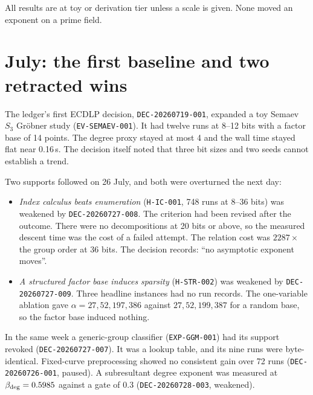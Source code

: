 \begin{table}[t]
\centering\small

\caption[]{ECDLP coordinator decisions by verdict class and month. Classes
follow the index's own plotting rule (\texttt{plot\_index.py}):
\texttt{approve*} and \texttt{revise*} are verdicts with that prefix,
\texttt{amend} and \texttt{refine} count as revisions, each outcome verdict
is matched exactly, and \emph{other} holds every remaining verdict string
(203, mostly free-text decisions of August). Oct-dated: decisions filed
under late-September names with October dates, left out of the
July--September counts. Counted by  from the
committed summary; the per-decision \texttt{INDEX.json} and \texttt{INDEX.tsv}
are held in the artefact store ().
Source: . Data:
.}
\label{tab:fr-julsep}
\end{table} All results are at toy or derivation tier unless a scale is given.
None moved an exponent on a prime field.

\section{July: the first baseline and two retracted wins}

The ledger's first ECDLP decision, \texttt{DEC-20260719-001}, expanded a
toy Semaev $S_3$ Gröbner study (\texttt{EV-SEMAEV-001}). It had twelve runs
at 8--12 bits with a factor base of 14 points. The degree proxy stayed at
most 4 and the wall time stayed flat near 0.16\,s. The decision itself
noted that three bit sizes and two seeds cannot establish a trend.

Two supports followed on 26 July, and both were overturned the next day:
\begin{itemize}
\item \emph{Index calculus beats enumeration} (\texttt{H-IC-001}, 748 runs
  at 8--36 bits) was weakened by \texttt{DEC-20260727-008}. The criterion
  had been revised after the outcome. There were no decompositions at 20
  bits or above, so the measured descent time was the cost of a failed
  attempt. The relation cost was $2287\times$ the group order at 36 bits.
  The decision records: ``no asymptotic exponent moves''.
\item \emph{A structured factor base induces sparsity} (\texttt{H-STR-002})
  was weakened by \texttt{DEC-20260727-009}. Three headline instances had
  no run records. The one-variable ablation gave $\alpha=27,52,197,386$
  against $27,52,199,387$ for a random base, so the factor base induced
  nothing.
\end{itemize}
In the same week a generic-group classifier (\texttt{EXP-GGM-001}) had its
support revoked (\texttt{DEC-20260727-007}). It was a lookup table, and its
nine runs were byte-identical. Fixed-curve preprocessing showed no consistent
gain over 72 runs (\texttt{DEC-20260726-001}, paused). A subresultant
degree exponent was measured at $\beta_{\rm deg}=0.5985$ against a gate of
$0.3$ (\texttt{DEC-20260728-003}, weakened).

